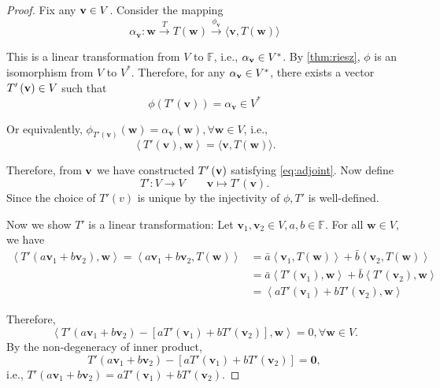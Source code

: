 \begin{proof} Fix any \({\bf v} \in  V\). Consider the mapping
\[
{\alpha }_{\mathbf{v}} : \mathbf{w}\overset{T}{ \rightarrow  }T\left( \mathbf{w}\right) \overset{{\phi }_{\mathbf{v}}}{ \rightarrow  }\langle \mathbf{v},T\left( \mathbf{w}\right) \rangle
\]

This is a linear transformation from \(V\) to \(\mathbb{F}\), i.e., \({\alpha }_{\bf v} \in  V^{ * }\). By \autoref{thm:riesz}, \(\phi\) is an isomorphism from \(V\) to \(V^{ * }\). Therefore, for any \({\alpha }_{\bf v} \in  {V}^{ * }\), there exists a vector \(T'\left( {\bf v}\right)  \in  V\) such that
\[
\phi \left( {T'\left( \mathbf{ v}\right) }\right)  = {\alpha }_{\mathbf{v}} \in  {V}^{ * }
\]

Or equivalently, \({\phi }_{T'\left( \mathbf{v}\right) }\left( \mathbf{w}\right)  = {\alpha }_{\mathbf{v}}\left( \mathbf{w}\right),\forall \mathbf{w} \in  V\), i.e., 
\begin{equation}\label{eq:adjoint}\left\langle  {T'\left( \mathbf{v}\right),\mathbf{w}}\right\rangle   = \langle \mathbf{v},T\left( \mathbf{w}\right) \rangle.\end{equation}

Therefore, from \(\bf v\) we have constructed \(T'\left(\bf v\right)\) satisfying \autoref{eq:adjoint}. Now define 
\[T' : V \rightarrow  V \quad \quad  \mathbf{v} \mapsto  T'\left( \mathbf{v}\right).\]
Since the choice of \(T'\left( v\right)\) is unique by the injectivity of \(\phi,T'\) is well-defined. 

Now we show \(T'\) is a linear transformation: Let \({\mathbf{v}}_{1},{\mathbf{v}}_{2} \in  V,a,b \in \mathbb{F}\). For all \(\mathbf{w} \in  V\), we have
\begin{align*}
\left\langle  {T'\left( {a{\mathbf{v}}_{1} + b{\mathbf{v}}_{2}}\right),\mathbf{w}}\right\rangle   = \left\langle  {a{\mathbf{v}}_{1} + b{\mathbf{v}}_{2},T\left( \mathbf{w}\right) }\right\rangle
&= \bar{a}\left\langle  {{\mathbf{v}}_{1},T\left( \mathbf{w}\right) }\right\rangle   + \bar{b}\left\langle  {{\mathbf{v}}_{2},T\left( \mathbf{w}\right) }\right\rangle
\\
&= \bar{a}\left\langle  {T'\left( {\mathbf{v}}_{1}\right),\mathbf{w}}\right\rangle   + \bar{b}\left\langle  {T'\left( {\mathbf{v}}_{2}\right),\mathbf{w}}\right\rangle
\\
&= \left\langle  {aT'\left( {\mathbf{v}}_{1}\right)  + bT'\left( {\mathbf{v}}_{2}\right),\mathbf{w}}\right\rangle
\end{align*}

Therefore, 
\[
\left\langle  {T'\left( {a{\mathbf{v}}_{1} + b{\mathbf{v}}_{2}}\right)  - \left\lbrack  {aT'\left( {\mathbf{v}}_{1}\right)  + bT'\left( {\mathbf{v}}_{2}\right) }\right\rbrack ,\mathbf{w}}\right\rangle   = 0,\forall \mathbf{w} \in  V.
\]
By the non-degeneracy of inner product,
\[
T'\left( {a{\mathbf{v}}_{1} + b{\mathbf{v}}_{2}}\right)  - \left\lbrack  {aT'\left( {\mathbf{v}}_{1}\right)  + bT'\left( {\mathbf{v}}_{2}\right) }\right\rbrack   = \mathbf{0},
\]
i.e., \(T'\left( {a{\mathbf{v}}_{1} + b{\mathbf{v}}_{2}}\right)  = aT'\left( {\mathbf{v}}_{1}\right)  + bT'\left( {\mathbf{v}}_{2}\right)\).
\end{proof}


